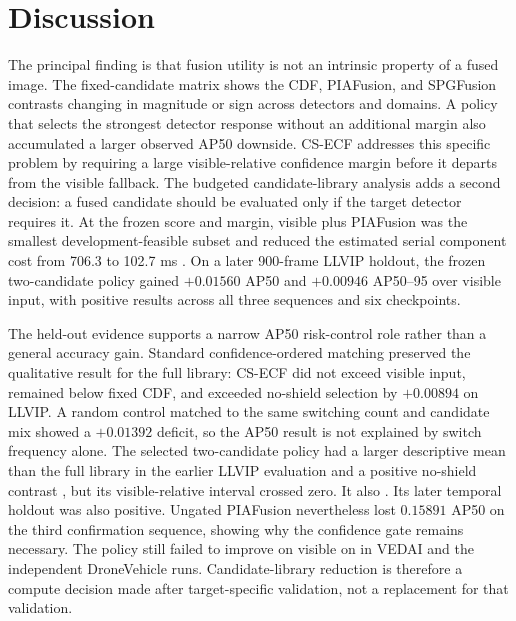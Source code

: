 \documentclass[preprint,11pt]{elsarticle}
\providecommand{\DIFaddtex}[1]{{\protect\color{blue} \sf #1}} %
\providecommand{\DIFdeltex}[1]{{\protect\color{red} \scriptsize #1}} %
\providecommand{\DIFaddbegin}{} %
\providecommand{\DIFaddend}{} %
\providecommand{\DIFdelbegin}{} %
\providecommand{\DIFdelend}{} %
\providecommand{\DIFadd}[1]{\texorpdfstring{\DIFaddtex{#1}}{#1}} %
\providecommand{\DIFdel}[1]{\texorpdfstring{\DIFdeltex{#1}}{}} %
\begin{document}
\section{Discussion}

The principal finding is that fusion utility is not an intrinsic property of a
fused image. The fixed-candidate matrix shows the CDF, PIAFusion, and SPGFusion
contrasts changing in magnitude or sign across detectors and domains. A policy
that selects the strongest detector response without an additional margin also
accumulated a larger observed AP50 downside. CS-ECF addresses this specific
problem by requiring a large visible-relative confidence margin before it
departs from the visible fallback. The budgeted candidate-library analysis adds
a second decision: a fused candidate should be evaluated only if the target
detector requires it. At the frozen score and margin, visible plus PIAFusion
was the smallest development-feasible subset\DIFdelbegin \DIFdel{and reduced the estimated serial
component cost from 706.3 to 102.7 ms}\DIFdelend \DIFaddbegin \DIFadd{. On a later 900-frame LLVIP
holdout, the frozen two-candidate policy gained \(+0.01560\) AP50 and
\(+0.00946\) AP50--95 over visible input, with positive results across all
three sequences and six checkpoints}\DIFaddend .

The held-out evidence supports a narrow AP50 risk-control role rather than a
general accuracy gain. Standard confidence-ordered matching preserved the
qualitative result for the full library: CS-ECF did not exceed visible input,
remained below fixed CDF, and exceeded no-shield selection by \(+0.00894\) on
LLVIP. A random control matched to the same switching count and candidate mix
showed a \(+0.01392\) deficit, so the AP50 result is not explained by switch
frequency alone. The selected two-candidate policy had a larger descriptive
mean than the full library \DIFaddbegin \DIFadd{in the earlier LLVIP evaluation }\DIFaddend and a positive
no-shield contrast\DIFdelbegin \DIFdel{, but its
visible-relative interval crossed zero. It also }\DIFdelend \DIFaddbegin \DIFadd{. Its later temporal holdout was also positive. Ungated
PIAFusion nevertheless lost \(0.15891\) AP50 on the third confirmation
sequence, showing why the confidence gate remains necessary. The policy still
}\DIFaddend failed to improve on visible \DIFdelbegin \DIFdel{on }\DIFdelend \DIFaddbegin \DIFadd{in }\DIFaddend VEDAI and the independent DroneVehicle runs.
Candidate-library reduction is therefore a compute decision made after
target-specific validation, not a replacement for that validation.
\end{document}

